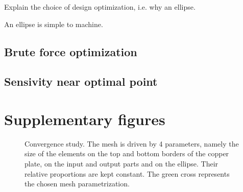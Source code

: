 \documentclass[]{article}
\begin{document}
Explain the choice of design optimization, i.e. why an ellipse.

An ellipse is simple to machine.

\subsection{Brute force optimization}

\subsection{Sensivity near optimal point}

\pagebreak

\section{Supplementary figures}

\begin{figure}[h]
    \centering
    
    \caption{
        Convergence study.
        The mesh is driven by 4 parameters, namely the size of the elements on the top and bottom borders of the copper plate,
        on the input and output parts and on the ellipse.
        Their relative proportions are kept constant.
        The \textcolor{darkpastelgreen}{green cross} represents the chosen mesh parametrization.
    }
    \label{figure:mesh-convergence}
\end{figure}
\end{document}
